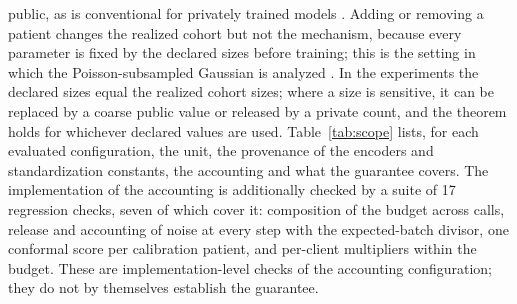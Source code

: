 public, as is conventional for privately trained models \cite{ref6}. Adding or
removing a patient changes the realized cohort but not the mechanism, because
every parameter is fixed by the declared sizes before training; this is the
setting in which the Poisson-subsampled Gaussian is analyzed
\cite{ref29, ref33}. In the experiments the declared sizes equal the realized
cohort sizes; where a size is sensitive, it can be replaced by a coarse public
value or released by a private count, and the theorem holds for whichever
declared values are used. Table~\ref{tab:scope} lists, for each evaluated configuration, the unit,
the provenance of the encoders and standardization constants, the accounting
and what the guarantee covers. The implementation of the accounting is
additionally checked by a suite of 17 regression checks, seven of which cover
it: composition of the budget across calls, release and accounting of noise at
every step with the expected-batch divisor, one conformal score per calibration
patient, and per-client multipliers within the budget. These are
implementation-level checks of the accounting configuration; they do not by
themselves establish the guarantee.

